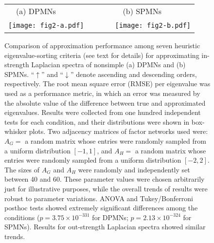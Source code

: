 \documentclass{article}
\begin{document}
\begin{figure}[t]
\centering
\begin{tabular}{lcl}
~~(a) DPMNs & ~~~~ & ~~(b) SPMNs \\
\texttt{[image: fig2-a.pdf]} & ~~~~ &
\texttt{[image: fig2-b.pdf]} \\
\end{tabular}
\caption{Comparison of approximation performance among seven heuristic
  eigenvalue-sorting criteria (see text for details) for approximating
  in-strength Laplacian spectra of nonsimple (a) DPMNs and (b)
  SPMNs. ``$\uparrow$'' and ``$\downarrow$'' denote ascending and
  descending orders, respectively. The root mean square error (RMSE)
  per eigenvalue was used as a performance metric, in which an error
  was measured by the absolute value of the difference between true
  and approximated eigenvalues. Results were collected from one
  hundred independent tests for each condition, and their
  distributions were shown in box-whisker plots. Two adjacency
  matrices of factor networks used were: $A_G=$ a random matrix whose
  entries were randomly sampled from a uniform distribution $[-1,1]$,
  and $A_H=$ a random matrix whose entries were randomly sampled from
  a uniform distribution $[-2,2]$. The sizes of $A_G$ and $A_H$ were
  randomly and independently set between 40 and 60. These parameter
  values were chosen arbitrarily just for illustrative purposes, while
  the overall trends of results were robust to parameter
  variations. ANOVA and Tukey/Bonferroni posthoc tests showed
  extremely significant differences among the conditions ($p=3.75
  \times 10^{-331}$ for DPMNs; $p=2.13 \times 10^{-324}$ for
  SPMNs). Results for out-strength Laplacian spectra showed similar
  trends.}
\label{fig:laplacian-approximation-nonsimple-sortings}
\end{figure}
\end{document}
